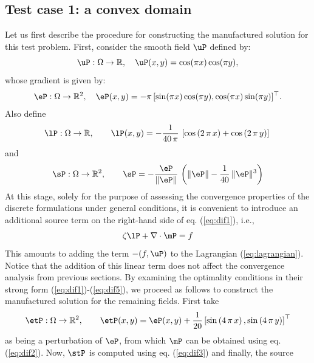 \subsection{Test case 1: a convex domain}\label{sec:test_case1}

Let us first describe the procedure for constructing the manufactured solution for this test problem. First, consider the smooth field $\uP$ defined by:
\begin{equation}
	\uP:\Omega \to \mathbb{R},\quad \uP(x,y) = \cos(\pi x)\cos(\pi y),
\end{equation}
whose gradient is given by:
\begin{equation*}
	\begin{aligned}
	\eP: \Omega \to \mathbb{R}^{2}, \quad \eP(x,y) = -\pi \, [\sin(\pi x)\cos(\pi y), \cos(\pi x)\sin(\pi y)]^{\top}. \\
	\end{aligned}
\end{equation*}
Also define 
$$
\lP: \Omega \rightarrow \mathbb{R},\qquad \lP(x,y) = -\frac{1}{40\,\pi}\,\left[\cos\left(2\,\pi\,x \right) + \cos\left(2\,\pi\,y \right)\right] \\ \\
$$
and
\begin{equation}
\sP:\Omega \rightarrow \mathbb{R}^2, \qquad \sP = -\dfrac{\eP}{\|\eP\|}\, \left(\|\eP\| - \dfrac{1}{40}\,\|\eP\|^{3}\right) \label{eq:constlaw}
\end{equation}
At this stage, solely for the purpose of assessing the convergence properties of the discrete formulations under general conditions, it is convenient to introduce an additional source term on the right-hand side of eq. (\ref{eq:dif1}), i.e.,
\begin{equation}
	\zeta \lP  + \nabla \cdot \mP  =  f \label{eq:balance_with_f}
\end{equation}
This amounts to adding the term $-({f , \uP})$ to the Lagrangian (\ref{eq:lagrangian}).
Notice that the addition of this linear term does not affect the convergence analysis from previous sections.
By examining the optimality conditions in their strong form (\ref{eq:dif1})-(\ref{eq:dif5}),
we proceed as follows to construct the manufactured solution for the remaining fields.
First take
$$
\etP:\Omega \rightarrow \mathbb{R}^2, \qquad \etP(x,y) = \eP(x,y) + \frac{1}{20} \left[\sin\left(4\,\pi\,x \right), \sin\left(4\,\pi\,y\right) \right]^{\top}
$$
as being a perturbation of $\eP$, from which $\mP$ can be obtained using eq. (\ref{eq:dif2}).
Now, $\stP$ is computed using eq. (\ref{eq:dif3}) and finally, the source 
